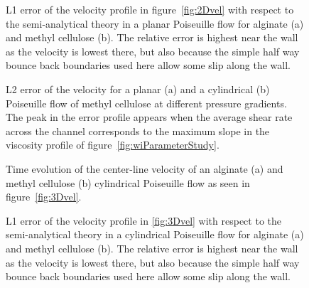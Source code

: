 \documentclass[a4paper,12pt]{scrartcl}
\begin{document}
	\begin{figure}[H]
		\centering
		\caption{L1 error of the velocity profile in figure~\ref{fig:2Dvel} with respect to the semi-analytical theory in a planar Poiseuille flow for alginate (a) and methyl cellulose (b).
			The relative error is highest near the wall as the velocity is lowest there, but also because the simple half way bounce back boundaries used here allow some slip along the wall.}
		\label{fig:2DvelErr}
	\end{figure}

	\begin{figure}[H]
		\centering
		\caption{L2 error of the velocity for a planar (a) and a cylindrical (b) Poiseuille flow of methyl cellulose at different pressure gradients.
		The peak in the error profile appears when the average shear rate across the channel corresponds to the maximum slope in the viscosity profile of figure~\ref{fig:wiParameterStudy}.}
		\label{fig:pressureErr}
	\end{figure}
	
	\begin{figure}[H]
		\centering
		\caption{Time evolution of the center-line velocity of an alginate (a) and methyl cellulose (b) cylindrical Poiseuille flow as seen in figure~\ref{fig:3Dvel}.}
		\label{fig:3DTimeEvolution}
	\end{figure}
	
		\begin{figure}[H]
		\centering
		\caption{L1 error of the velocity profile in \ref{fig:3Dvel} with respect to the semi-analytical theory in a cylindrical Poiseuille flow for alginate (a) and methyl cellulose (b).
			The relative error is highest near the wall as the velocity is lowest there, but also because the simple half way bounce back boundaries used here allow some slip along the wall.}
		\label{fig:3DvelErr}
	\end{figure}
	
\end{document}
